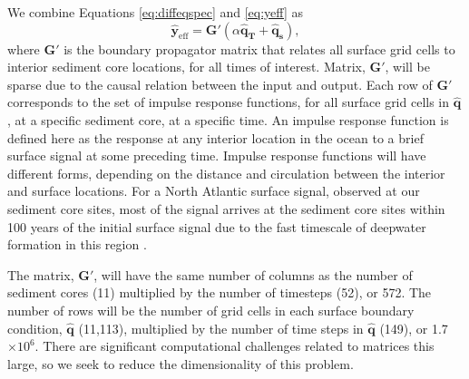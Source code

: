 \documentclass[draft]{agujournal2019}
\begin{document}
We combine Equations \ref{eq:diffeqspec} and \ref{eq:yeff} as
\begin{equation}
\label{eq:modeleq}
\mathbf{\hat{y}}_{\mathrm{eff}} = \mathbf{G}' (\alpha \mathbf{\hat{q}_{T}} + \mathbf{\hat{q}_{s}}), 
\end{equation}
where $\mathbf{G}'$ is the boundary propagator matrix that relates all surface grid cells to interior sediment core locations, for all times of interest. Matrix, $\mathbf{G'}$, will be sparse due to the causal relation between the input and output. Each row of $\mathbf{G'}$ corresponds to the set of impulse response functions, for all surface grid cells in $\mathbf{\hat{q}}$, at a specific sediment core, at a specific time. An impulse response function is defined here as the response at any interior location in the ocean to a brief surface signal at some preceding time. Impulse response functions will have different forms, depending on the distance and circulation between the interior and surface locations. For a North Atlantic surface signal, observed at our sediment core sites, most of the signal arrives at the sediment core sites within 100 years of the initial surface signal due to the fast timescale of deepwater formation in this region \cite{Lu-Oppo-2023:Surface}. 

The matrix, $\mathbf{G}'$, will have the same number of columns as the number of sediment cores (11) multiplied by the number of timesteps (52), or 572. The number of rows will be the number of grid cells in each surface boundary condition, $\mathbf{\hat{q}}$ (11,113), multiplied by the number of time steps in $\mathbf{\hat{q}}$ (149), or 1.7$\times 10^{6}$. There are significant computational challenges related to matrices this large, so we seek to reduce the dimensionality of this problem.
\end{document}

